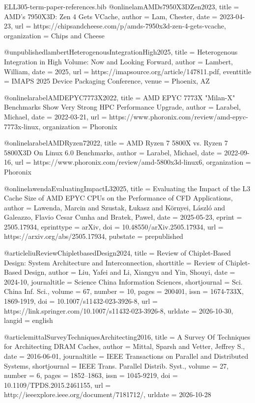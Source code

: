 \begin{filecontents*}[overwrite]{ELL305-term-paper-references.bib}
@online{lamAMDs7950X3DZen2023,
  title = {{{AMD}}'s {{7950X3D}}: {{Zen}} 4 {{Gets VCache}}},
  author = {Lam, Chester},
  date = {2023-04-23},
  url = {https://chipsandcheese.com/p/amds-7950x3d-zen-4-gets-vcache},
  organization = {Chips and Cheese}
}

@unpublished{lambertHeterogenousIntegrationHigh2025,
  title = {Heterogenous {{Integration}} in {{High Volume}}: {{Now}} and {{Looking Forward}}},
  author = {Lambert, William},
  date = {2025},
  url = {https://imapsource.org/article/147811.pdf},
  eventtitle = {{{IMAPS}} 2025 {{Device Packaging Conference}}},
  venue = {Phoenix, AZ}
}

@online{larabelAMDEPYC7773X2022,
  title = {{{AMD EPYC 7773X}} "{{Milan-X}}" {{Benchmarks Show Very Strong HPC Performance Upgrade}}},
  author = {Larabel, Michael},
  date = {2022-03-21},
  url = {https://www.phoronix.com/review/amd-epyc-7773x-linux},
  organization = {Phoronix}
}

@online{larabelAMDRyzen72022,
  title = {{{AMD Ryzen}} 7 {{5800X}} vs. {{Ryzen}} 7 {{5800X3D On Linux}} 6.0 {{Benchmarks}}},
  author = {Larabel, Michael},
  date = {2022-09-16},
  url = {https://www.phoronix.com/review/amd-5800x3d-linux6},
  organization = {Phoronix}
}

@online{lawendaEvaluatingImpactL32025,
  title = {Evaluating the Impact of the {{L3}} Cache Size of {{AMD EPYC CPUs}} on the Performance of {{CFD}} Applications},
  author = {Lawenda, Marcin and Szustak, Łukasz and Környei, László and Galeazzo, Flavio Cesar Cunha and Bratek, Paweł},
  date = {2025-05-23},
  eprint = {2505.17934},
  eprinttype = {arXiv},
  doi = {10.48550/arXiv.2505.17934},
  url = {https://arxiv.org/abs/2505.17934},
  pubstate = {prepublished}
}

@article{liuReviewChipletbasedDesign2024,
  title = {Review of Chiplet-Based Design: System Architecture and Interconnection},
  shorttitle = {Review of Chiplet-Based Design},
  author = {Liu, Yafei and Li, Xiangyu and Yin, Shouyi},
  date = {2024-10},
  journaltitle = {Science China Information Sciences},
  shortjournal = {Sci. China Inf. Sci.},
  volume = {67},
  number = {10},
  pages = {200401},
  issn = {1674-733X, 1869-1919},
  doi = {10.1007/s11432-023-3926-8},
  url = {https://link.springer.com/10.1007/s11432-023-3926-8},
  urldate = {2026-10-30},
  langid = {english}
}

@article{mittalSurveyTechniquesArchitecting2016,
  title = {A {{Survey Of Techniques}} for {{Architecting DRAM Caches}}},
  author = {Mittal, Sparsh and Vetter, Jeffrey S.},
  date = {2016-06-01},
  journaltitle = {IEEE Transactions on Parallel and Distributed Systems},
  shortjournal = {IEEE Trans. Parallel Distrib. Syst.},
  volume = {27},
  number = {6},
  pages = {1852--1863},
  issn = {1045-9219},
  doi = {10.1109/TPDS.2015.2461155},
  url = {http://ieeexplore.ieee.org/document/7181712/},
  urldate = {2026-10-28}
}


\end{filecontents*}

